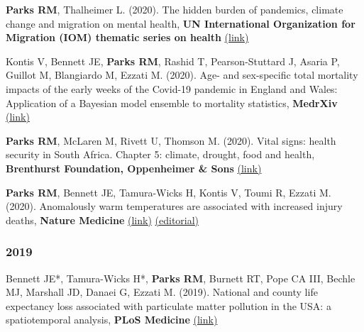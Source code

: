 {\noindent \textbf{Parks RM}, Thalheimer L. (2020). The hidden burden of pandemics, climate change and migration on mental health, \textbf{UN International Organization for Migration (IOM) thematic series on health} \href{https://environmentalmigration.iom.int/blogs/hidden-burden-pandemics-climate-change-and-migration-mental-health}{(link)} \smallskip

\noindent Kontis V, Bennett JE, \textbf{Parks RM}, Rashid T, Pearson-Stuttard J, Asaria P, Guillot M, Blangiardo M, Ezzati M. (2020). Age- and sex-specific total mortality impacts of the early weeks of the Covid-19 pandemic in England and Wales: Application of a Bayesian model ensemble to mortality statistics, \textbf{MedrXiv} \href{https://www.medrxiv.org/content/10.1101/2020.05.20.20107680v1}{(link)} \smallskip

\noindent \textbf{Parks RM}, McLaren M, Rivett U, Thomson M. (2020). Vital signs: health security in South Africa. Chapter 5: climate, drought, food and health, \textbf{Brenthurst Foundation, Oppenheimer \& Sons} \href{https://www.thebrenthurstfoundation.org/downloads/vital-signs-ebook-pdf.pdf}{(link)} \smallskip

\noindent \textbf{Parks RM}, Bennett JE, Tamura-Wicks H, Kontis V, Toumi R, Ezzati M. (2020). Anomalously warm temperatures are associated with increased injury deaths, \textbf{Nature Medicine} \href{https://www.nature.com/articles/s41591-019-0721-y}{(link)} \href{https://www.nature.com/articles/s41591-019-0728-4}{(editorial)}


% 


\subsubsection*{2019}

\noindent Bennett JE*, Tamura-Wicks H*, \textbf{Parks RM}, Burnett RT, Pope CA III, Bechle MJ, Marshall JD, Danaei G, Ezzati M. (2019). National and county life expectancy loss associated with particulate matter pollution in the USA: a spatiotemporal analysis, \textbf{PLoS Medicine} \href{https://doi.org/10.1371/journal.pmed.1002856}{(link)} \smallskip

}
